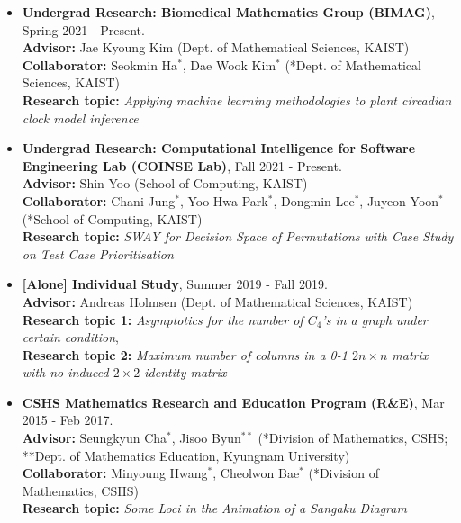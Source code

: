 \documentclass[10pt,a4]{article}
\begin{document}
\begin{small}
\begin{itemize}
 \item {\bf Undergrad Research: Biomedical Mathematics Group (BIMAG)}, Spring 2021 - Present. \\
{\bf Advisor:} Jae Kyoung Kim (Dept. of Mathematical Sciences, KAIST) \\
{\bf Collaborator:} Seokmin Ha$^{*}$, Dae Wook Kim$^{*}$ (*Dept. of Mathematical Sciences, KAIST) \\
{\bf Research topic:} {\it Applying machine learning methodologies to plant circadian clock model inference} \\

 \item {\bf Undergrad Research: Computational Intelligence for Software Engineering Lab (COINSE Lab)}, Fall 2021 - Present. \\
{\bf Advisor:} Shin Yoo (School of Computing, KAIST) \\
 {\bf Collaborator:} Chani Jung$^{*}$, Yoo Hwa Park$^{*}$, Dongmin Lee$^{*}$, Juyeon Yoon$^{*}$ (*School of Computing, KAIST) \\
{\bf Research topic:} {\it SWAY for Decision Space of Permutations with Case Study on Test Case Prioritisation } \\

 \item {\bf [Alone] Individual Study}, Summer 2019 - Fall 2019. \\
 {\bf Advisor:} Andreas Holmsen (Dept. of Mathematical Sciences, KAIST) \\
 {\bf Research topic 1:} {\it Asymptotics for the number of $C_4$'s in a graph under certain condition}, \\
 {\bf Research topic 2:} {\it Maximum number of columns in a 0-1 $2n \times n$ matrix with no induced $2 \times 2$ identity matrix} \\

\item {\bf CSHS Mathematics Research and Education Program (R\&E)}, Mar 2015 - Feb 2017. \\
 {\bf Advisor:} Seungkyun Cha$^{*}$, Jisoo Byun$^{**}$ (*Division of Mathematics, CSHS; **Dept. of Mathematics Education, Kyungnam University) \\
 {\bf Collaborator:} Minyoung Hwang$^{*}$, Cheolwon Bae$^{*}$ (*Division of Mathematics, CSHS) \\
 {\bf Research topic:} {\it Some Loci in the Animation of a Sangaku Diagram} \\
 

\end{itemize}
\end{small}
\end{document}

